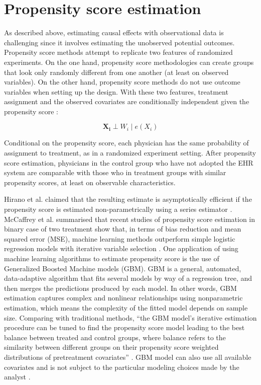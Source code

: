 \documentclass[12pt]{report}
\begin{document}
\section{Propensity score estimation}
As described above, estimating causal effects with observational data is challenging since it involves estimating the unobserved potential outcomes. Propensity score methods attempt to replicate two features of randomized experiments. On the one hand, propensity score methodologies can create groups that look only randomly different from one another (at least on observed variables). On the other hand, propensity score methods do not use outcome variables when setting up the design. With these two features, treatment assignment and the observed covariates are conditionally independent given the propensity score \citep{guo2014propensity}:

\begin{equation*}
\boldsymbol{X_i} \perp W_i \mid e(X_i)
\end{equation*}

Conditional on the propensity score, each physician has the same probability of assignment to treatment, as in a randomized experiment setting. After propensity score estimation, physicians in the control group who have not adopted the EHR system are comparable with those who in treatment groups with similar propensity scores, at least on observable characteristics. 

Hirano et al. claimed that the resulting estimate is asymptotically efficient if the propensity score is estimated non-parametrically using a series estimator \citep{hirano2003efficient}. McCaffrey et al. summarised that recent studies of propensity score estimation in binary case of two treatment show that, in terms of bias reduction and mean squared error (MSE), machine learning methods outperform simple logistic regression models with iterative variable selection \citep{mccaffrey2013tutorial}. One application of using machine learning algorithms to estimate propensity score is the use of Generalized Boosted Machine models (GBM). GBM is a general, automated, data-adaptive algorithm that fits several models by way of a regression tree, and then merges the predictions produced by each model. In other words, GBM estimation captures complex and nonlinear relationships using nonparametric estimation, which means the complexity of the fitted model depends on sample size. Comparing with traditional methods, ``the GBM model's iterative estimation procedure can be tuned to find the propensity score model leading to the best balance between treated and control groups, where balance refers to the similarity between different groups on their propensity score weighted distributions of pretreatment covariates''  \citep{mccaffrey2013tutorial}. GBM model can also use all available covariates and is not subject to the particular modeling choices made by the analyst \citep{hillm2015short}.
\end{document}
